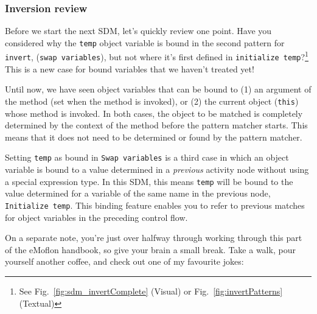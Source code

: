 \newpage
\subsubsection{Inversion review}
\genHeader
\hypertarget{invert close}{}

Before we start the next SDM, let's quickly review one point. Have you considered why the \texttt{temp} object variable is bound in the second pattern for
\texttt{invert}, (\texttt{swap variables}), but not where it's first defined in \texttt{initialize temp}?\footnote{See Fig.~\ref{fig:sdm_invertComplete}
(Visual) or Fig.~\ref{fig:invertPatterns} (Textual)} This is a new case for bound variables that we haven't treated yet!

Until now, we have seen object variables that can be bound to (1) an argument of the method (set when the method is invoked), or (2) the
current object (\texttt{this}) whose method is invoked. In both cases, the object to be matched is completely determined by the context of the method before
the pattern matcher starts. This means that it does not need to be determined or found by the pattern matcher.

Setting \texttt{temp} as bound in \texttt{Swap variables} is a third case in which an object variable is bound to a value determined in a \emph{previous}
activity node without using a special expression type. In this SDM, this means \texttt{temp} will be bound to the value determined for a variable
of the same name in the previous node, \texttt{Initialize temp}. This binding feature enables you to refer to previous matches for object variables in the
preceding control flow.

On a separate note, you're just over halfway through working through this part of the eMoflon handbook, so give your brain a small break. Take a walk, pour
yourself another coffee, and check out one of my favourite jokes:

\vspace{0.5cm}

